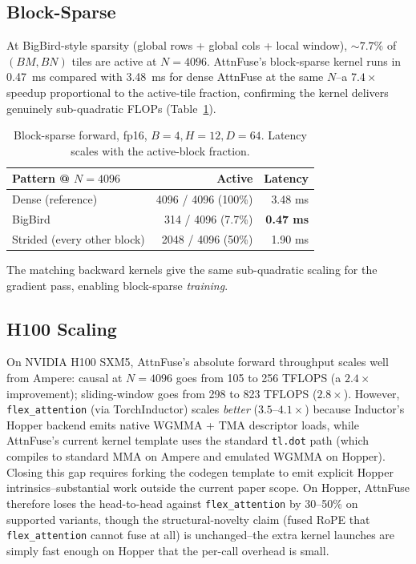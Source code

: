 \documentclass[10pt,twocolumn]{article}
\begin{document}
\subsection{Block-Sparse}

At BigBird-style sparsity (global rows + global cols + local window),
$\sim7.7\%$ of $(BM, BN)$ tiles are active at $N{=}4096$. AttnFuse's
block-sparse kernel runs in 0.47~ms compared with 3.48~ms for dense
AttnFuse at the same $N$--a $7.4\times$ speedup proportional to the
active-tile fraction, confirming the kernel delivers genuinely
sub-quadratic FLOPs (Table~\ref{tab:bs}).

\begin{table}[H]
\centering\small
\begin{tabular}{lrr}
\toprule
\textbf{Pattern @ $N{=}4096$} & \textbf{Active} & \textbf{Latency} \\
\midrule
Dense (reference)             & 4096 / 4096 (100\%) & 3.48 ms \\
BigBird                       &  314 / 4096 (7.7\%) & \textbf{0.47 ms} \\
Strided (every other block)   & 2048 / 4096 (50\%)  & 1.90 ms \\
\bottomrule
\end{tabular}
\caption{Block-sparse forward, fp16, $B{=}4, H{=}12, D{=}64$.
Latency scales with the active-block fraction.}
\label{tab:bs}
\end{table}

The matching backward kernels give the same sub-quadratic scaling for
the gradient pass, enabling block-sparse \emph{training}.

\subsection{H100 Scaling}
\label{sec:hopper}

On NVIDIA H100 SXM5, AttnFuse's absolute forward throughput scales
well from Ampere: causal at $N{=}4096$ goes from 105 to 256 TFLOPS (a
$2.4\times$ improvement); sliding-window goes from 298 to 823 TFLOPS
($2.8\times$). However, \texttt{flex\_attention} (via TorchInductor)
scales \emph{better} ($3.5$--$4.1\times$) because Inductor's Hopper
backend emits native WGMMA + TMA descriptor loads, while AttnFuse's
current kernel template uses the standard \texttt{tl.dot} path (which
compiles to standard MMA on Ampere and emulated WGMMA on Hopper).
Closing this gap requires forking the codegen template to emit explicit
Hopper intrinsics--substantial work outside the current paper scope.
On Hopper, AttnFuse therefore loses the head-to-head against
\texttt{flex\_attention} by 30--50\% on supported variants, though the
structural-novelty claim (fused RoPE that \texttt{flex\_attention}
cannot fuse at all) is unchanged--the extra kernel launches are simply
fast enough on Hopper that the per-call overhead is small.
\end{document}
